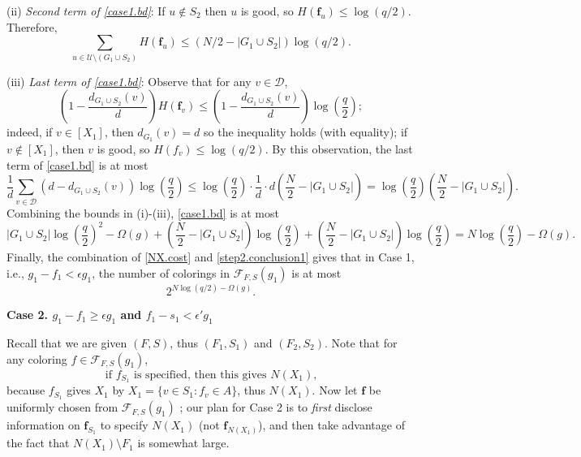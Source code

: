 \documentclass{amsart}
\theoremstyle{definition}
\newcommand{\gO}{\Omega}
\newcommand{\cD}{\mathcal{D} }
\newcommand{\cF}{\mathcal{F} }
\newcommand{\cU}{\mathcal{U} }
\newcommand{\bbf}{\mathbf{f}}
\newcommand{\beq}[1]{\begin{equation}\label{#1}}
\newcommand{\enq}[0]{\end{equation}}
\newcommand{\eps}{\epsilon}
\newcommand{\nin}[0]{\noindent}
\newcommand{\0}[0]{\emptyset}
\begin{document}
\nin (ii) \textit{Second term of \eqref{case1.bd}}: If $u \not \in S_2$ then $u$ is good, so $H(\bbf_u) \le \log (q/2)$. Therefore,
\[\sum_{u \in \cU \setminus (G_1 \cup S_2)} H(\bbf_u) \le (N/2-|G_1 \cup S_2|)\log(q/2).\]

\nin (iii) \textit{Last term of \eqref{case1.bd}}:  Observe that for any $v \in \cD$,
\beq{eq.1}\left(1-\frac{d_{G_1 \cup S_2}(v)}{d}\right)H(\bbf_v) \le \left(1-\frac{d_{G_1 \cup S_2}(v)}{d}\right)\log\left(\frac{q}{2}\right);\enq
indeed, if $v \in [X_1]$, then $d_{G_1}(v)=d$ so the inequality holds (with equality); if $v \not\in [X_1]$, then $v$ is good, so $H(f_v) \le \log(q/2)$. By this observation, the last term of \eqref{case1.bd} is at most
\[\frac{1}{d}\sum_{v \in \cD} (d-d_{G_1 \cup S_2}(v))\log\left(\frac{q}{2}\right) \le \log \left(\frac{q}{2}\right) \cdot \frac{1}{d} \cdot d\left(\frac N2-|G_1 \cup S_2|\right)=\log\left(\frac{q}{2}\right)\left(\frac N2-|G_1 \cup S_2|\right).\]
Combining the bounds in (i)-(iii), \eqref{case1.bd} is at most
\beq{step2.conclusion1}|G_1 \cup S_2|\log\left(\frac{q}{2}\right)^2-\gO(g)+\left(\frac N2-|G_1 \cup S_2|\right)\log \left(\frac{q}{2}\right) +\left(\frac N2-|G_1 \cup S_2|\right)\log \left(\frac{q}{2}\right)=N\log\left(\frac{q}{2}\right)-\gO(g).\enq
Finally, the combination of \eqref{NX.cost} and \eqref{step2.conclusion1} gives that in Case 1, i.e., $g_1 - f_1 < \eps g_1$, the number of colorings in $\cF_{F, S}(g_1)$ is at most \[
2^{N\log(q/2)-\gO(g)}.\]


\noindent \textbf{Case 2. $g_1-f_1 \ge \eps g_1$ and $f_1-s_1 < \eps' g_1$}  

 Recall that we are given $(F,S)$, thus $(F_1,S_1)$ and $(F_2,S_2)$. Note that for any coloring $f\in \cF_{F, S}(g_1)$,
\beq{s gives g} \mbox{if $f_{S_1}$ is specified, then this gives $N(X_1)$,}\enq
because $f_{S_1}$ gives $X_1$ by $X_1=\{v\in S_1: f_v\in A\}$, thus $N(X_1)$. Now let $\bbf$ be uniformly chosen from $\cF_{F, S}(g_1)$ ; our plan for Case 2 is to \textit{first} disclose information on $\bbf_{S_1}$ to specify $N(X_1)$ (not $\bbf_{N(X_1)}$), and then take advantage of the fact that $N(X_1) \setminus F_1$ is somewhat large.
\end{document}
